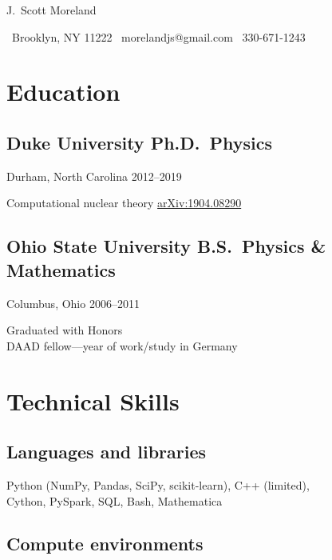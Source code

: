 \documentclass[letterpaper,10pt]{article}
\begin{document}
\newcommand{\sep}{{\quad\textbar\quad}}

\begin{center}
  {\huge\raleway J.\ Scott Moreland}
\end{center}

\begin{center}
  \small
  \, Brooklyn, NY 11222 \sep
  \, morelandjs@gmail.com \sep
  \, 330-671-1243
\end{center}

\smallskip

\newcommand{\subheading}[3]{{\small #1 \hfill #2--#3}}

\begin{multicols}{2}

\section{Education}

\subsection{Duke University \hfill Ph.D.\ Physics}
\subheading{Durham, North Carolina}{2012}{2019}

Computational nuclear theory \hfill
\href{https://arxiv.org/abs/1904.08290}{\small arXiv:1904.08290}

\subsection{Ohio State University \hfill B.S.\ Physics \& Mathematics}
\subheading{Columbus, Ohio}{2006}{2011}

Graduated with Honors\\
DAAD fellow---year of work/study in Germany

\section{Technical Skills}

\subsection{Languages and libraries}
\smallskip

Python (NumPy, Pandas, SciPy, scikit-learn), C++ (limited), \\
Cython, PySpark, SQL, Bash, Mathematica

\subsection{Compute environments}
\smallskip


\end{multicols}
\end{document}
